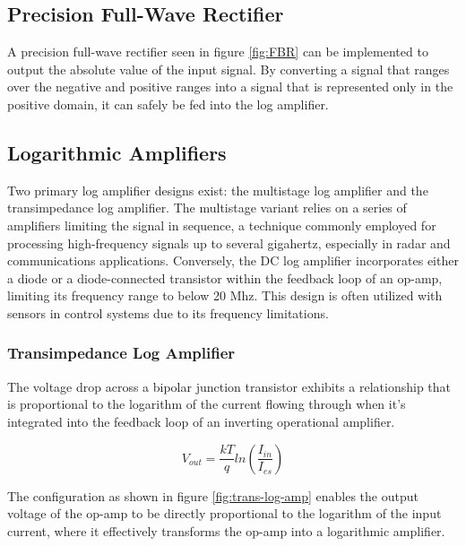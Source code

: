 \documentclass[10pt]{article}
\begin{document}
\begin{multicols*}{2}
            \subsection{Precision Full-Wave Rectifier}
                A precision full-wave rectifier seen in figure \ref{fig:FBR} can be implemented to output the absolute value of the input signal. By converting a signal that ranges over the negative and positive ranges into a signal that is represented only in the positive domain, it can safely be fed into the log amplifier.
                
            \subsection{Logarithmic Amplifiers} \label{sect:log-amp}
                Two primary log amplifier designs exist: the multistage log amplifier and the transimpedance log amplifier. The multistage variant relies on a series of amplifiers limiting the signal in sequence, a technique commonly employed for processing high-frequency signals up to several gigahertz, especially in radar and communications applications. Conversely, the DC log amplifier incorporates either a diode or a diode-connected transistor within the feedback loop of an op-amp, limiting its frequency range to below 20 Mhz. This design is often utilized with sensors in control systems due to its frequency limitations.\par

                \subsubsection{Transimpedance Log Amplifier}
                    The voltage drop across a bipolar junction transistor exhibits a relationship that is proportional to the logarithm of the current flowing through when it's integrated into the feedback loop of an inverting operational amplifier. 
                    
                        \begin{equation}
                            V_{out}=\frac{kT}{q}ln(\frac{I_{in}}{I_{es}})
                        \end{equation}
                    
                    \noindent The configuration as shown in figure \ref{fig:trans-log-amp} enables the output voltage of the op-amp to be directly proportional to the logarithm of the input current, where it effectively transforms the op-amp into a logarithmic amplifier.\par


\end{multicols*}
\end{document}
